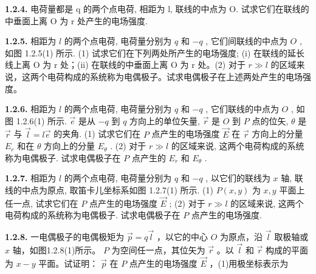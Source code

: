 \vfill

\newpage
\textbf{1.2.4.} 电荷量都是 q 的两个点电荷, 相距为 l, 联线的中点为 O. 试求它们在联线的中垂面上离 O 为 r 处产生的电场强度.

\vfill

\textbf{1.2.5.} 相距为 $l$ 的两个点电荷, 电荷量分别为 $q$ 和 $-q$ , 它们间联线的中点为 $O$ , 如图 1.2.5(1) 所示. (1) 试求它们在下列两处所产生的电场强度; (i) 在联线的延长线上离 O 为 r 处；(ii) 在联线的中垂面上离 O 为 r 处。(2) 对于 $r \gg l$ 的区域来说，这两个电荷构成的系统称为电偶极子。试求电偶极子在上述两处产生的电场强度。



\begin{center}
\end{center}


\vfill

\newpage
\textbf{1.2.6.} 相距为 $l$ 的两个点电荷, 电荷量分别为 $q$ 和 $-q$ , 它们联线的中点为 $O$ , 如图 1.2.6(1) 所示. $\vec{e}$ 是从 $-q$ 到 $q$ 方向上的单位矢量, $\vec{r}$ 是 $O$ 到 $P$ 点的位矢, $\theta$ 是 $\vec{r}$ 与 $\vec{l}=l\vec{e}$ 的夹角. (1) 试求它们在 $P$ 点产生的电场强度 $\vec{E}$ 在 $\vec{r}$ 方向上的分量 $E_r$ 和在 $\theta$ 方向上的分量 $E_\theta$ . (2) 对于 $r \gg l$ 的区域来说, 这两个电荷构成的系统称为电偶极子. 试求电偶极子在 $P$ 点产生的 $E_r$ 和 $E_\theta$ .



\begin{center}
\end{center}


\vfill

\textbf{1.2.7.} 相距为 $l$ 的两个点电荷, 电荷量分别为 $q$ 和 $-q$ , 以它们的联线为 $x$ 轴, 联线的中点为原点, 取笛卡儿坐标系如图 1.2.7(1) 所示. (1) $P(x, y)$ 为 $x, y$ 平面上任一点, 试求它们在 $P$ 点产生的电场强度 $\vec{E}$ ; (2) 对于 $r \gg l$ 的区域来说, 这两个电荷构成的系统称为电偶极子. 试求电偶极子在 $P$ 点产生的电场强度.



\begin{center}
\end{center}


\vfill

\newpage
\textbf{1.2.8.} 一电偶极子的电偶极矩为 $\vec{p} = q\vec{l}$ ，以它的中心 $O$ 为原点，沿 $\vec{l}$ 取极轴或 $x$ 轴，如图1.2.8(1)所示。 $P$ 为空间任一点，其位矢为 $\vec{r}$ 。以 $\vec{l}$ 和 $\vec{r}$ 构成的平面为 $x - y$ 平面。试证明： $\vec{p}$ 在 $P$ 点产生的电场强度 $\vec{E}$ ，(1)用极坐标表示为

